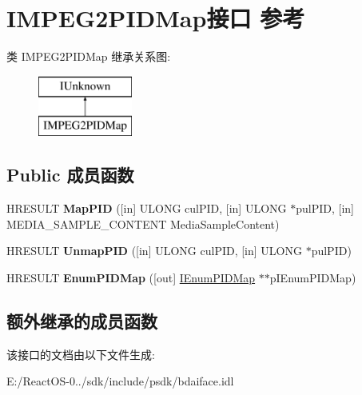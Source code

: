 \hypertarget{interface_i_m_p_e_g2_p_i_d_map}{}\section{I\+M\+P\+E\+G2\+P\+I\+D\+Map接口 参考}
\label{interface_i_m_p_e_g2_p_i_d_map}
类 I\+M\+P\+E\+G2\+P\+I\+D\+Map 继承关系图\+:\begin{figure}[H]
\begin{center}
\leavevmode
\includegraphics[height=2.000000cm]{interface_i_m_p_e_g2_p_i_d_map}
\end{center}
\end{figure}
\subsection*{Public 成员函数}
\begin{DoxyCompactItemize}
\item 
\mbox{\label{interface_i_m_p_e_g2_p_i_d_map_a8cfd8d3eb674fd0e99ab52df1b4aeb51}} 
H\+R\+E\+S\+U\+LT {\bfseries Map\+P\+ID} (\mbox{[}in\mbox{]} U\+L\+O\+NG cul\+P\+ID, \mbox{[}in\mbox{]} U\+L\+O\+NG $\ast$pul\+P\+ID, \mbox{[}in\mbox{]} M\+E\+D\+I\+A\+\_\+\+S\+A\+M\+P\+L\+E\+\_\+\+C\+O\+N\+T\+E\+NT Media\+Sample\+Content)
\item 
\mbox{\label{interface_i_m_p_e_g2_p_i_d_map_a55cb906b6f473b2b8787827489d6da79}} 
H\+R\+E\+S\+U\+LT {\bfseries Unmap\+P\+ID} (\mbox{[}in\mbox{]} U\+L\+O\+NG cul\+P\+ID, \mbox{[}in\mbox{]} U\+L\+O\+NG $\ast$pul\+P\+ID)
\item 
\mbox{\label{interface_i_m_p_e_g2_p_i_d_map_ae2729f851ebc2c2184fceaf08daf6ea2}} 
H\+R\+E\+S\+U\+LT {\bfseries Enum\+P\+I\+D\+Map} (\mbox{[}out\mbox{]} \hyperlink{interface_i_enum_p_i_d_map}{I\+Enum\+P\+I\+D\+Map} $\ast$$\ast$p\+I\+Enum\+P\+I\+D\+Map)
\end{DoxyCompactItemize}
\subsection*{额外继承的成员函数}


该接口的文档由以下文件生成\+:\begin{DoxyCompactItemize}
\item 
E\+:/\+React\+O\+S-\/0../sdk/include/psdk/bdaiface.\+idl\end{DoxyCompactItemize}
